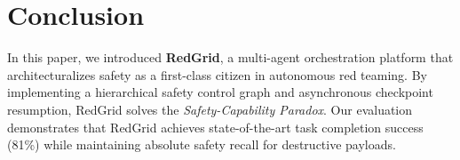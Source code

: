 \documentclass[conference]{IEEEtran}
\begin{document}
\section{Conclusion}
\label{sec:conclusion}

In this paper, we introduced \textbf{RedGrid}, a multi-agent orchestration platform that architecturalizes safety as a first-class citizen in autonomous red teaming. By implementing a hierarchical safety control graph and asynchronous checkpoint resumption, RedGrid solves the \textit{Safety-Capability Paradox}. Our evaluation demonstrates that RedGrid achieves state-of-the-art task completion success (81\%) while maintaining absolute safety recall for destructive payloads.



\end{document}
